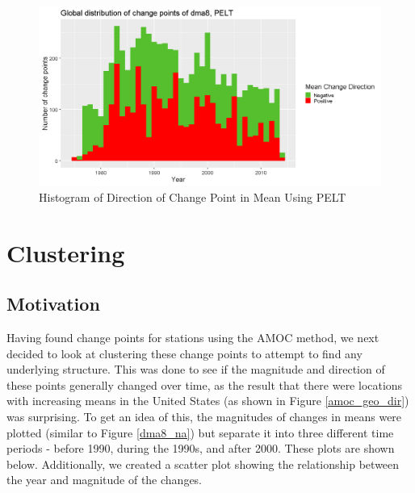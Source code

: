 \documentclass[11pt, oneside]{article}
\theoremstyle{definition}
\begin{document}
\begin{figure}[ht]
    \centering
    \includegraphics[width=0.8\linewidth]{plots/change_direction_PELT.png}
    \caption{Histogram of Direction of Change Point in Mean Using PELT}
    \label{pelt_hist_dir}
\end{figure}

\section{Clustering}
\subsection{Motivation}
Having found change points for stations using the AMOC method, we next decided to look at clustering these change points to attempt to find any underlying structure. This was done to see if the magnitude and direction of these points generally changed over time, as the result that there were locations with increasing means in the United States (as shown in Figure \ref{amoc_geo_dir}) was surprising. To get an idea of this, the magnitudes of changes in means were plotted (similar to Figure \ref{dma8_na}) but separate it into three different time periods - before 1990, during the 1990s, and after 2000. These plots are shown below. Additionally, we created a scatter plot showing the relationship between the year and magnitude of the changes.
\end{document}
